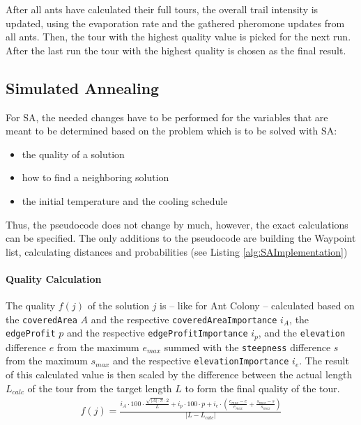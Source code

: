 After all ants have calculated their full tours, the overall trail intensity is updated, using the evaporation rate and the gathered pheromone updates from all ants. 
Then, the tour with the highest quality value is picked for the next run. 
After the last run the tour with the highest quality is chosen as the final result.



\subsection{Simulated Annealing}
\label{subsec:simulatedAnnealingImplementation}

For SA, the needed changes have to be performed for the variables that are meant to be determined based on the problem which is to be solved with SA:
\begin{itemize}
	\item the quality of a solution
	\item how to find a neighboring solution
	\item the initial temperature and the cooling schedule
\end{itemize} 

Thus, the pseudocode does not change by much, however, the exact calculations can be specified. 
The only additions to the pseudocode are building the Waypoint list, calculating distances and probabilities (see Listing \ref{alg:SAImplementation})

\paragraph{Quality Calculation}

The quality $f(j)$ of the solution $j$ is -- like for Ant Colony -- calculated based on the \texttt{coveredArea} $A$ and the respective \texttt{coveredAreaImportance} $i_A$, the \texttt{edgeProfit} $p$ and the respective \texttt{edgeProfitImportance} $i_p$, and the \texttt{elevation} difference $e$ from the maximum $e_{max}$  summed with the \texttt{steepness} difference $s$ from the maximum $s_{max}$ and the respective \texttt{elevationImportance} $i_e$.
The result of this calculated value is then scaled by the difference between the actual length $L_{calc}$ of the tour from the target length $L$ to form the final quality of the tour.
\begin{equation}
	\label{eq:qualitySA}
	\begin{split}
		f(j) = \frac{i_A \cdot 100 \cdot \frac{\sqrt{|A|\cdot \pi} \cdot 2 }{L} 
		+  i_p \cdot 100 \cdot p
		+ i_e \cdot \left(\frac{e_{max} - e}{e_{max}} + \frac{s_{max} - s}{s_{max}}\right)}{\left| L - L_{calc} \right|}
	\end{split}
\end{equation}

